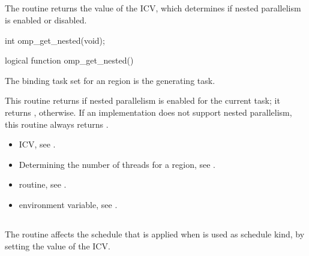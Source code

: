 \subsection{}
\label{subsec:omp_get_nested}
\summary
The  routine returns the value of the  ICV, which 
determines if nested parallelism is enabled or disabled.

\format
\ccppspecificstart
\begin{boxedcode}
int omp\_get\_nested(void);
\end{boxedcode}
\ccppspecificend

\fortranspecificstart
\begin{boxedcode}
logical function omp\_get\_nested()
\end{boxedcode}
\fortranspecificend

\binding
The binding task set for an  region is the generating task. 

\effect
This routine returns  if nested parallelism is enabled for the current task; it returns 
, otherwise. If an implementation does not support nested parallelism, this routine 
always returns .

\crossreferences
\begin{itemize}
\item {} ICV, see 
.

\item Determining the number of threads for a  region, see
. 

\item {} routine, see 
.

\item {} environment variable, see 
.
\end{itemize}









\subsection{}
\label{subsec:omp_set_schedule}
\summary
The  routine affects the schedule that is applied when  
is used as schedule kind, by setting the value of the  ICV. 

